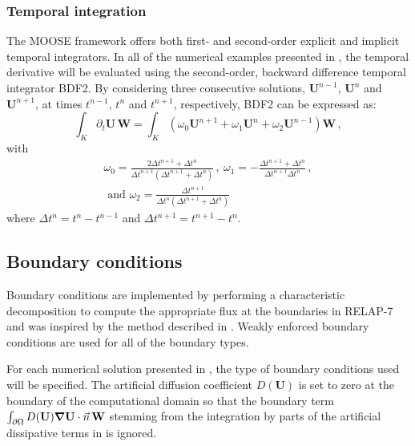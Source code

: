 \documentclass{mc2015}
\begin{document}
\subsubsection{Temporal integration} 
%
The MOOSE framework offers both first- and second-order explicit and implicit temporal integrators. 
In all of the numerical examples presented in , the temporal derivative  will be 
evaluated using the second-order, backward difference temporal integrator BDF2. By considering three 
consecutive solutions, $\mathbf U^{n-1}$, $\mathbf U^n$ and $\mathbf U^{n+1}$, at times $t^{n-1}$, $t^n$ and $t^{n+1}$, respectively, BDF2 can be expressed as:
\begin{equation}
\label{eq:BDF2}
\int_{K} \partial_t \mathbf U \, \mathbf  W = \int_{K} \left( \omega_0 \mathbf U^{n+1}  + \omega_1 \mathbf U^n + \omega_2 \mathbf U^{n-1} \right) \mathbf W \,,
\end{equation}
with
\begin{multline}
\omega_0 =\frac{2\Delta t^{n+1}+\Delta t^n}{\Delta t^{n+1} \left( \Delta t^{n+1}+\Delta t^n \right)} \, , \ 
\omega_1 = -\frac{\Delta t^{n+1}+\Delta t^n}{\Delta t^{n+1} \Delta t^n}  \, , \\
\text{ and } \omega_2 = \frac{\Delta t^{n+1}}{\Delta t^n \left( \Delta t^{n+1} + \Delta t^n \right)} \nonumber
\end{multline}
where $\Delta t^{n} = t^n-t^{n-1}$ and $\Delta t^{n+1} = t^{n+1}-t^{n}$.
%
\subsection{Boundary conditions} \label{sec:bc}
%
Boundary conditions are implemented by performing a characteristic decomposition to compute the 
appropriate flux at the boundaries in RELAP-7 and was inspired by the method described in \cite{SEM}. 
Weakly enforced boundary conditions are used for all of the boundary types.

For each numerical solution presented in , the type of boundary conditions used 
will be specified. The artificial diffusion coefficient $D(\mathbf  U)$ is set to zero at the boundary of the computational 
domain so that the boundary term 
$\int_{\partial \Omega} D(\mathbf  U) \boldsymbol\nabla \mathbf  U \cdot \vec{n} \, \mathbf W$ stemming from the 
integration by parts of the artificial dissipative terms in \eqt{eq:cfem} is ignored.
%
\end{document}
